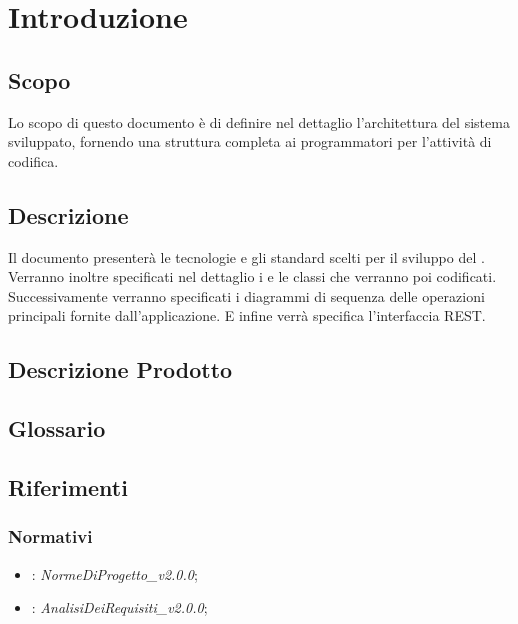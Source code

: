 \documentclass[12pt,a4paper]{article}
\begin{document}
\newpage
\tableofcontents
\newpage
\listoftables
\listoffigures
\newpage

\section{Introduzione}	\label{intro}
\subsection{Scopo}
Lo scopo di questo documento è di definire nel dettaglio l'architettura del sistema sviluppato, fornendo una struttura completa ai programmatori per l'attività di codifica.

\subsection{Descrizione}
Il documento presenterà le tecnologie e gli standard scelti per il sviluppo del . Verranno inoltre specificati nel dettaglio i  e le classi che verranno poi codificati. Successivamente verranno specificati i diagrammi di sequenza delle operazioni principali fornite dall'applicazione. E infine verrà specifica l'interfaccia REST.

\subsection{Descrizione Prodotto}
\descrizioneProdotto

\subsection{Glossario}
\glossarioPrint

\subsection{Riferimenti}

\subsubsection{Normativi}
\begin{itemize}
    \item \NdP{}: \textit{NormeDiProgetto\_v2.0.0};
    \item \AdR{}: \textit{AnalisiDeiRequisiti\_v2.0.0};
\end{itemize}
\end{document}
